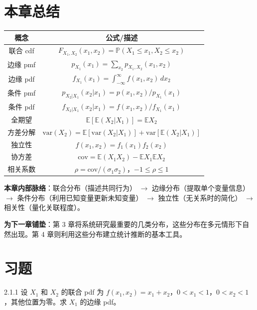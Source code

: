 \section{本章总结}\label{sec:chapter2-summary}

\begin{center}
\begin{tabular}{|c|c|}
\hline
\textbf{概念} & \textbf{公式/描述} \\ \hline
联合 cdf & $F_{X_1,X_2}(x_1,x_2) = \mathbb{P}(X_1\leq x_1, X_2\leq x_2)$ \\ \hline
边缘 pmf & $p_{X_1}(x_1) = \sum_{x_2} p_{X_1,X_2}(x_1,x_2)$ \\ \hline
边缘 pdf & $f_{X_1}(x_1) = \int_{-\infty}^{\infty} f(x_1,x_2)\,dx_2$ \\ \hline
条件 pmf & $p_{X_2|X_1}(x_2|x_1) = p(x_1,x_2)/p_{X_1}(x_1)$ \\ \hline
条件 pdf & $f_{X_2|X_1}(x_2|x_1) = f(x_1,x_2)/f_{X_1}(x_1)$ \\ \hline
全期望 & $\mathbb{E}[\mathbb{E}(X_2|X_1)] = \mathbb{E}X_2$ \\ \hline
方差分解 & $\text{var}(X_2) = \mathbb{E}[\text{var}(X_2|X_1)] + \text{var}[\mathbb{E}(X_2|X_1)]$ \\ \hline
独立性 & $f(x_1,x_2) = f_1(x_1)f_2(x_2)$ \\ \hline
协方差 & $\text{cov} = \mathbb{E}(X_1X_2) - \mathbb{E}X_1\mathbb{E}X_2$ \\ \hline
相关系数 & $\rho = \text{cov}/(\sigma_1\sigma_2)$，$-1 \leq \rho \leq 1$ \\ \hline
\end{tabular}
\end{center}

\textbf{本章内部脉络}：联合分布（描述共同行为） $\to$ 边缘分布（提取单个变量信息） $\to$ 条件分布（利用已知变量更新未知变量） $\to$ 独立性（无关系时的简化） $\to$ 相关性（量化关联程度）。

\textbf{为下一章铺垫}：第 3 章将系统研究最重要的几类分布，这些分布在多元情形下自然出现。第 4 章则利用这些分布建立统计推断的基本工具。

\section*{习题}\label{sec:exercises-ch2}

\begin{exercise}{2.1.1}
设 $X_1$ 和 $X_2$ 的联合 pdf 为 $f(x_1, x_2) = x_1 + x_2$，$0 < x_1 < 1$，$0 < x_2 < 1$，其他位置为零。求 $X_1$ 的边缘 pdf。
\end{exercise}

